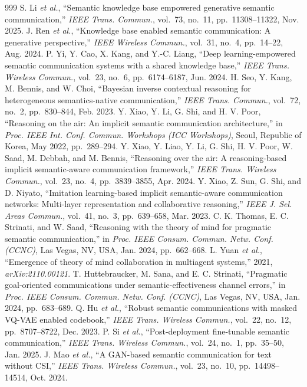\begin{thebibliography}{999}
 S. Li \emph{et al.}, ``Semantic knowledge base empowered generative semantic communication,'' \emph{IEEE Trans. Commun.}, vol.~73, no.~11, pp.~11308--11322, Nov. 2025.
 J. Ren \emph{et al.}, ``Knowledge base enabled semantic communication: A generative perspective,'' \emph{IEEE Wireless Commun.}, vol.~31, no.~4, pp.~14--22, Aug. 2024.
 P. Yi, Y. Cao, X. Kang, and Y.-C. Liang, ``Deep learning-empowered semantic communication systems with a shared knowledge base,'' \emph{IEEE Trans. Wireless Commun.}, vol.~23, no.~6, pp.~6174--6187, Jun. 2024.
 H. Seo, Y. Kang, M. Bennis, and W. Choi, ``Bayesian inverse contextual reasoning for heterogeneous semantics-native communication,'' \emph{IEEE Trans. Commun.}, vol.~72, no.~2, pp.~830--844, Feb. 2023.
 Y. Xiao, Y. Li, G. Shi, and H. V. Poor, ``Reasoning on the air: An implicit semantic communication architecture,'' in \emph{Proc. IEEE Int. Conf. Commun. Workshops (ICC Workshops)}, Seoul, Republic of Korea, May 2022, pp.~289--294.
 Y. Xiao, Y. Liao, Y. Li, G. Shi, H. V. Poor, W. Saad, M. Debbah, and M. Bennis, ``Reasoning over the air: A reasoning-based implicit semantic-aware communication framework,'' \emph{IEEE Trans. Wireless Commun.}, vol.~23, no.~4, pp.~3839--3855, Apr. 2024.
 Y. Xiao, Z. Sun, G. Shi, and D. Niyato, ``Imitation learning-based implicit semantic-aware communication networks: Multi-layer representation and collaborative reasoning,'' \emph{IEEE J. Sel. Areas Commun.}, vol.~41, no.~3, pp.~639--658, Mar. 2023.
 C. K. Thomas, E. C. Strinati, and W. Saad, ``Reasoning with the theory of mind for pragmatic semantic communication,'' in \emph{Proc. IEEE Consum. Commun. Netw. Conf. (CCNC)}, Las Vegas, NV, USA, Jan. 2024, pp.~662--668.
 L. Yuan \emph{et al.}, ``Emergence of theory of mind collaboration in multiagent systems,'' 2021, \emph{arXiv:2110.00121}.
 T. Huttebraucker, M. Sana, and E. C. Strinati, ``Pragmatic goal-oriented communications under semantic-effectiveness channel errors,'' in \emph{Proc. IEEE Consum. Commun. Netw. Conf. (CCNC)}, Las Vegas, NV, USA, Jan. 2024, pp.~683--689.
 Q. Hu \emph{et al.}, ``Robust semantic communications with masked VQ-VAE enabled codebook,'' \emph{IEEE Trans. Wireless Commun.}, vol.~22, no.~12, pp.~8707--8722, Dec. 2023.
 P. Si \emph{et al.}, ``Post-deployment fine-tunable semantic communication,'' \emph{IEEE Trans. Wireless Commun.}, vol.~24, no.~1, pp.~35--50, Jan. 2025.
 J. Mao \emph{et al.}, ``A GAN-based semantic communication for text without CSI,'' \emph{IEEE Trans. Wireless Commun.}, vol.~23, no.~10, pp.~14498--14514, Oct. 2024.

\end{thebibliography}
